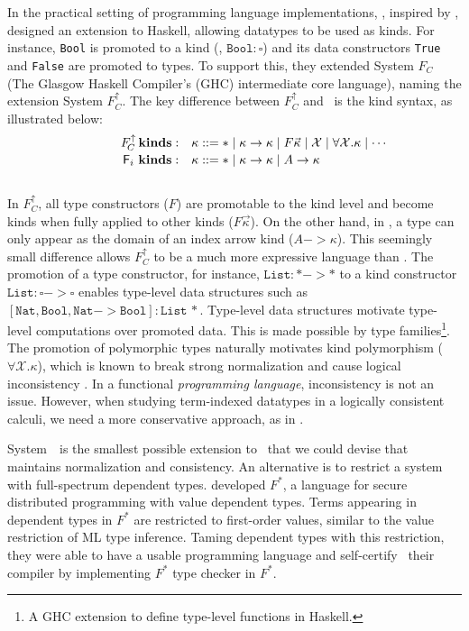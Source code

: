 In the practical setting of programming language implementations,
\citet{YorgeyWCJVM12}, inspired by \citet{SHE}, designed an extension
to Haskell, allowing datatypes to be used as kinds. For instance, \texttt{Bool}
is promoted to a kind (\ie, $\texttt{Bool}:\square$) and its data constructors
\texttt{True} and \texttt{False} are promoted to types. To support this,
they extended System $F_{\!C}$ (The Glasgow Haskell Compiler's (GHC) intermediate core language), 
naming the extension System $F_{\!C}^\uparrow$.
The key difference between $F_{\!C}^\uparrow$ and \Fi\ is the kind syntax, as illustrated below: \vspace*{-2pt}
\[\qquad\quad
\begin{array}{ll}
F_{\!C}^\uparrow\,\textbf{kinds}: &
\kappa ::= * \mid \kappa -> \kappa \mid F \vec{\kappa} \mid \mathcal{X} \mid \forall \mathcal{X}.\kappa \mid \cdots \\
\,\Fi\,\,\textbf{kinds}: &
\kappa ::= * \mid \kappa -> \kappa \mid A -> \kappa \phantom{A^{A^A}}
\end{array}  
\] ~\vspace*{-6pt}\\
In $F_{\!C}^\uparrow$, all type constructors ($F$) are promotable to the 
kind level and become kinds when fully applied to other kinds
($F\vec\kappa$). On the other hand, in \Fi,  a type can only appear
as the domain of an index arrow kind ($A-> \kappa$). This seemingly small
difference allows $F_{\!C}^\uparrow$ to be a much
more expressive language than \Fi. The promotion of
a type constructor, for instance, $\texttt{List}:* -> *$ to a kind constructor
$\texttt{List}:\square-> \square$ enables type-level data structures
such as $\mathtt{[Nat,Bool,Nat-> Bool]:List\,*}$. Type-level
data structures motivate type-level computations over promoted data.
This is made possible by type families\footnote{
	A GHC extension to define type-level functions in Haskell.}.
The promotion of polymorphic types naturally motivates
kind polymorphism ($\forall \mathcal{X}.\kappa$), which is known to
break strong normalization and cause logical inconsistency \cite{Girard72}.
In a functional {\em programming language},
inconsistency is not an issue. However, when studying
term-indexed datatypes in a logically consistent calculi, we need
a more conservative approach, as in \Fi.

System~\Fi\ is the smallest possible
extension to \Fw\ that we could devise that maintains normalization and consistency.
An alternative is to restrict a system with full-spectrum dependent types.
\citet{Swamy11} developed $F^{*}$,
a language for secure distributed programming with value dependent types.
Terms appearing in dependent types in $F^{*}$ are restricted to first-order %
values, similar to the value restriction of ML type inference. 
Taming dependent types with this restriction, they were able to have a usable programming language
and self-certify~\cite{Strub12} their compiler by implementing $F^{*}$
type checker in $F^{*}$.

